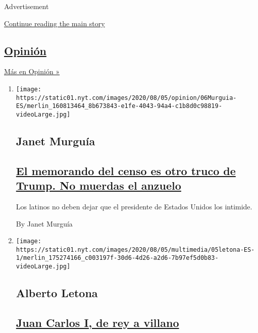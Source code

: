 Advertisement

\protect\hyperlink{after-mid1}{Continue reading the main story}

\hypertarget{opiniuxf3n}{%
\subsection{\texorpdfstring{\href{/es/section/opinion}{Opinión}}{Opinión}}\label{opiniuxf3n}}

\href{/es/section/opinion}{Más en Opinión »}

\begin{enumerate}
\def\labelenumi{\arabic{enumi}.}
\item
  \texttt{[image: https://static01.nyt.com/images/2020/08/05/opinion/06Murguia-ES/merlin\_160813464\_8b673843-e1fe-4043-94a4-c1b8d0c98819-videoLarge.jpg]}

  \hypertarget{janet-murguuxeda}{%
  \subsection{Janet Murguía}\label{janet-murguuxeda}}

  \hypertarget{el-memorando-del-censo-es-otro-truco-de-trump-no-muerdas-el-anzuelo}{%
  \subsection{\texorpdfstring{\href{/es/2020/08/06/espanol/opinion/censo-inmigrantes-trump.html}{El
  memorando del censo es otro truco de Trump. No muerdas el
  anzuelo}}{El memorando del censo es otro truco de Trump. No muerdas el anzuelo}}\label{el-memorando-del-censo-es-otro-truco-de-trump-no-muerdas-el-anzuelo}}

  Los latinos no deben dejar que el presidente de Estados Unidos los
  intimide.

  By Janet Murguía
\item
  \texttt{[image: https://static01.nyt.com/images/2020/08/05/multimedia/05letona-ES-1/merlin\_175274166\_c003197f-30d6-4d26-a2d6-7b97ef5d0b83-videoLarge.jpg]}

  \hypertarget{alberto-letona}{%
  \subsection{Alberto Letona}\label{alberto-letona}}

  \hypertarget{juan-carlos-i-de-rey-a-villano}{%
  \subsection{\texorpdfstring{\href{/es/2020/08/05/espanol/opinion/juan-carlos-exilio-espana.html}{Juan
  Carlos I, de rey a
  villano}}{Juan Carlos I, de rey a villano}}\label{juan-carlos-i-de-rey-a-villano}}


\end{enumerate}
